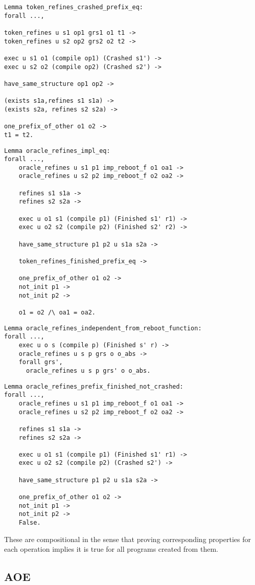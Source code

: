\begin{verbatim}
Lemma token_refines_crashed_prefix_eq:
forall ...,

token_refines u s1 op1 grs1 o1 t1 ->
token_refines u s2 op2 grs2 o2 t2 ->

exec u s1 o1 (compile op1) (Crashed s1') ->
exec u s2 o2 (compile op2) (Crashed s2') ->

have_same_structure op1 op2 -> 

(exists s1a,refines s1 s1a) ->
(exists s2a, refines s2 s2a) ->

one_prefix_of_other o1 o2 ->
t1 = t2.
\end{verbatim}

\begin{verbatim}
Lemma oracle_refines_impl_eq:
forall ...,
    oracle_refines u s1 p1 imp_reboot_f o1 oa1 ->
    oracle_refines u s2 p2 imp_reboot_f o2 oa2 ->
    
    refines s1 s1a ->
    refines s2 s2a ->
    
    exec u o1 s1 (compile p1) (Finished s1' r1) ->
    exec u o2 s2 (compile p2) (Finished s2' r2) ->
    
    have_same_structure p1 p2 u s1a s2a ->
    
    token_refines_finished_prefix_eq ->
    
    one_prefix_of_other o1 o2 ->
    not_init p1 ->
    not_init p2 ->
    
    o1 = o2 /\ oa1 = oa2.
\end{verbatim}

\begin{verbatim}
Lemma oracle_refines_independent_from_reboot_function:
forall ...,
    exec u o s (compile p) (Finished s' r) ->
    oracle_refines u s p grs o o_abs ->
    forall grs', 
      oracle_refines u s p grs' o o_abs.
\end{verbatim}

\begin{verbatim}
Lemma oracle_refines_prefix_finished_not_crashed:
forall ...,
    oracle_refines u s1 p1 imp_reboot_f o1 oa1 ->
    oracle_refines u s2 p2 imp_reboot_f o2 oa2 ->
    
    refines s1 s1a ->
    refines s2 s2a ->
    
    exec u o1 s1 (compile p1) (Finished s1' r1) ->
    exec u o2 s2 (compile p2) (Crashed s2') ->
    
    have_same_structure p1 p2 u s1a s2a ->
    
    one_prefix_of_other o1 o2 ->
    not_init p1 ->
    not_init p2 ->
    False.
\end{verbatim}

These are compositional in the sense that proving corresponding properties for 
each operation implies it is true for all programs created from them. 

\subsection{AOE}
